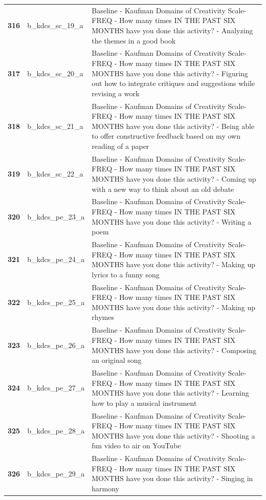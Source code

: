 \documentclass[
  letterpaper,
  DIV=11,
  numbers=noendperiod]{scrartcl}
\begin{document}
\begin{longtable}[t]{>{}cll}
\addlinespace
\textbf{316} & b\_kdcs\_sc\_19\_a & Baseline - Kaufman Domains of Creativity Scale-FREQ - How many times IN THE PAST SIX MONTHS have you done this activity? - Analyzing the themes in a good book\\
\textbf{317} & b\_kdcs\_sc\_20\_a & Baseline - Kaufman Domains of Creativity Scale-FREQ - How many times IN THE PAST SIX MONTHS have you done this activity? - Figuring out how to integrate critiques and suggestions while revising a work\\
\textbf{318} & b\_kdcs\_sc\_21\_a & Baseline - Kaufman Domains of Creativity Scale-FREQ - How many times IN THE PAST SIX MONTHS have you done this activity? - Being able to offer constructive feedback based on my own reading of a paper\\
\textbf{319} & b\_kdcs\_sc\_22\_a & Baseline - Kaufman Domains of Creativity Scale-FREQ - How many times IN THE PAST SIX MONTHS have you done this activity? - Coming up with a new way to think about an old debate\\
\textbf{320} & b\_kdcs\_pe\_23\_a & Baseline - Kaufman Domains of Creativity Scale-FREQ - How many times IN THE PAST SIX MONTHS have you done this activity? - Writing a poem\\
\addlinespace
\textbf{321} & b\_kdcs\_pe\_24\_a & Baseline - Kaufman Domains of Creativity Scale-FREQ - How many times IN THE PAST SIX MONTHS have you done this activity? - Making up lyrics to a funny song\\
\textbf{322} & b\_kdcs\_pe\_25\_a & Baseline - Kaufman Domains of Creativity Scale-FREQ - How many times IN THE PAST SIX MONTHS have you done this activity? - Making up rhymes\\
\textbf{323} & b\_kdcs\_pe\_26\_a & Baseline - Kaufman Domains of Creativity Scale-FREQ - How many times IN THE PAST SIX MONTHS have you done this activity? - Composing an original song\\
\textbf{324} & b\_kdcs\_pe\_27\_a & Baseline - Kaufman Domains of Creativity Scale-FREQ - How many times IN THE PAST SIX MONTHS have you done this activity? - Learning how to play a musical instrument\\
\textbf{325} & b\_kdcs\_pe\_28\_a & Baseline - Kaufman Domains of Creativity Scale-FREQ - How many times IN THE PAST SIX MONTHS have you done this activity? - Shooting a fun video to air on YouTube\\
\addlinespace
\textbf{326} & b\_kdcs\_pe\_29\_a & Baseline - Kaufman Domains of Creativity Scale-FREQ - How many times IN THE PAST SIX MONTHS have you done this activity? - Singing in harmony\\

\end{longtable}
\end{document}
